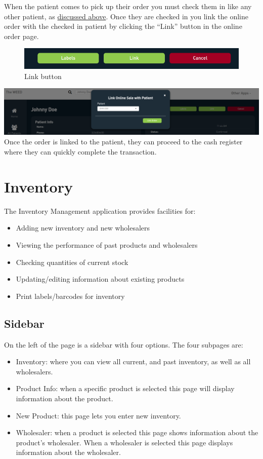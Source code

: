 \documentclass[]{book}
\theoremstyle{definition}
\theoremstyle{definition}
\theoremstyle{definition}
\theoremstyle{remark}
\begin{document}
When the patient comes to pick up their order you must check them in
like any other patient, as
\protect\hyperlink{returning-patients}{discussed above}. Once they are
checked in you link the online order with the checked in patient by
clicking the ``Link'' button in the online order page.

\begin{figure}
\centering
\includegraphics{images/online10.png}
\caption{Link button}
\end{figure}

\includegraphics{images/online9.png} Once the order is linked to the
patient, they can proceed to the cash register where they can quickly
complete the transaction.

\chapter{Inventory}\label{inventory}

The Inventory Management application provides facilities for:

\begin{itemize}
\item
  Adding new inventory and new wholesalers
\item
  Viewing the performance of past products and wholesalers
\item
  Checking quantities of current stock
\item
  Updating/editing information about existing products
\item
  Print labels/barcodes for inventory
\end{itemize}

\section{Sidebar}\label{sidebar-1}

On the left of the page is a sidebar with four options. The four
subpages are:

\begin{itemize}
\item
  Inventory: where you can view all current, and past inventory, as well
  as all wholesalers.
\item
  Product Info: when a specific product is selected this page will
  display information about the product.
\item
  New Product: this page lets you enter new inventory.
\item
  Wholesaler: when a product is selected this page shows information
  about the product's wholesaler. When a wholesaler is selected this
  page displays information about the wholesaler.
\end{itemize}
\end{document}
